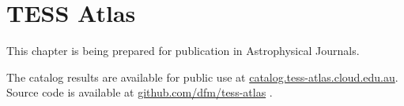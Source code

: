 \chapter[TESS Atlas]{TESS Atlas}
\label{ch.tess}

This chapter is being prepared for publication in Astrophysical Journals. 

\begin{quote}
\end{quote}

The catalog results are available for public use at \href{http://catalog.tess-atlas.cloud.edu.au/}{catalog.tess-atlas.cloud.edu.au}. Source code is available at \href{https://github.com/dfm/tess-atlas}{github.com/dfm/tess-atlas} \href{https://github.com/dfm/tess-atlas}{\GhIcon}.


